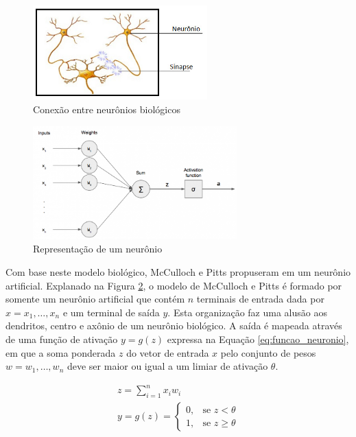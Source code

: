 \begin{figure}[ht]
	\centering
	\includegraphics[width=0.6\textwidth]{img/redeneuralbiologica.jpg}
	\caption{Conexão entre neurônios biológicos}
	\label{fig:redeneuralbiologica}
\end{figure}

\begin{figure}[ht]
	\centering
	\includegraphics[width=0.7\textwidth]{img/perceptron.png}
	\caption{Representação de um neurônio}
	\label{fig:neuronio}
\end{figure}

Com base neste modelo biológico, McCulloch e Pitts propuseram em \cite{mcculloch1943logical} um neurônio artificial. Explanado na Figura \ref{fig:neuronio}, o modelo de McCulloch e Pitts é formado por somente um neurônio artificial que contém $n$ terminais de entrada dada por $ x = x_1, \ldots, x_n$ e um terminal de saída $y$. Esta organização faz uma alusão aos dendritos, centro e axônio de um neurônio biológico. A saída é mapeada através de uma função de ativação $y = g(z)$ expressa na Equação \ref{eq:funcao_neuronio}, em que a soma ponderada $z$ do vetor de entrada $x$ pelo conjunto de pesos $w = w_1, \ldots, w_n$ deve ser maior ou igual a um limiar de ativação $\theta$.

\begin{gather}\label{eq:funcao_neuronio}
	z = \sum_{i=1}^n x_i w_i\\
	y = g(z) =
		\begin{cases}
			0, & \text{se } z < \theta\\
			1, & \text{se } z \geq \theta
		\end{cases}
\end{gather}

